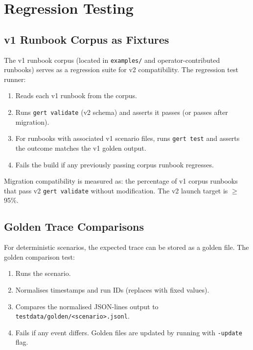 \section{Regression Testing}

\subsection{v1 Runbook Corpus as Fixtures}

The v1 runbook corpus (located in \texttt{examples/} and operator-contributed runbooks) serves as a regression suite for v2 compatibility. The regression test runner:

\begin{enumerate}
  \item Reads each v1 runbook from the corpus.
  \item Runs \texttt{gert validate} (v2 schema) and asserts it passes (or passes after migration).
  \item For runbooks with associated v1 scenario files, runs \texttt{gert test} and asserts the outcome matches the v1 golden output.
  \item Fails the build if any previously passing corpus runbook regresses.
\end{enumerate}

Migration compatibility is measured as: the percentage of v1 corpus runbooks that pass v2 \texttt{gert validate} without modification. The v2 launch target is $\geq$95\%.

\subsection{Golden Trace Comparisons}

For deterministic scenarios, the expected trace can be stored as a golden file. The golden comparison test:

\begin{enumerate}
  \item Runs the scenario.
  \item Normalises timestamps and run IDs (replaces with fixed values).
  \item Compares the normalised JSON-lines output to \texttt{testdata/golden/<scenario>.jsonl}.
  \item Fails if any event differs. Golden files are updated by running with \texttt{-update} flag.
\end{enumerate}

